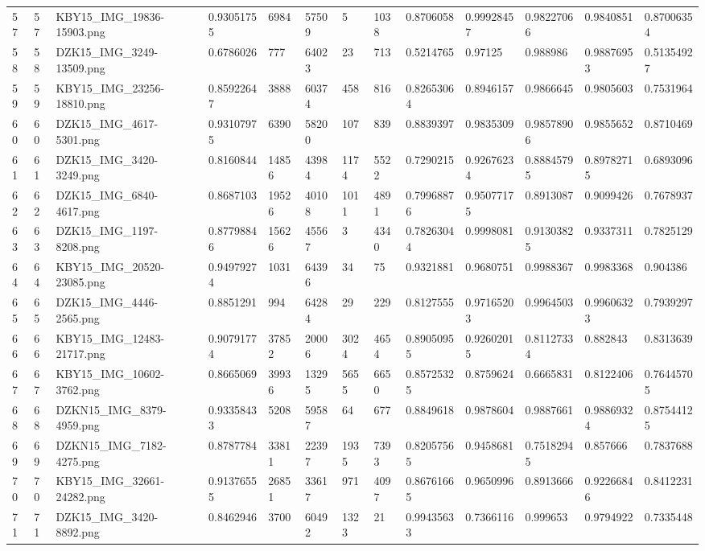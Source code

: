 \documentclass[11pt, a4paper, twoside]{report}
\begin{document}
\begin{longtable}[c]{@{}lllllllllllll@{}}
57 & 57 & KBY15\_IMG\_19836-15903.png & 0.93051755 & 6984 & 57509 & 5 & 1038 & 0.8706058 & 0.99928457 & 0.98227066 & 0.9840851 & 0.87006354 \\
58 & 58 & DZK15\_IMG\_3249-13509.png & 0.6786026 & 777 & 64023 & 23 & 713 & 0.5214765 & 0.97125 & 0.988986 & 0.98876953 & 0.51354927 \\
59 & 59 & KBY15\_IMG\_23256-18810.png & 0.85922647 & 3888 & 60374 & 458 & 816 & 0.82653064 & 0.8946157 & 0.9866645 & 0.9805603 & 0.7531964 \\
60 & 60 & DZK15\_IMG\_4617-5301.png & 0.93107975 & 6390 & 58200 & 107 & 839 & 0.8839397 & 0.9835309 & 0.98578906 & 0.9855652 & 0.8710469 \\
61 & 61 & DZK15\_IMG\_3420-3249.png & 0.8160844 & 14856 & 43984 & 1174 & 5522 & 0.7290215 & 0.92676234 & 0.88845795 & 0.89782715 & 0.6893096 \\
62 & 62 & DZK15\_IMG\_6840-4617.png & 0.8687103 & 19526 & 40108 & 1011 & 4891 & 0.79968876 & 0.95077175 & 0.8913087 & 0.9099426 & 0.7678937 \\
63 & 63 & DZK15\_IMG\_1197-8208.png & 0.87798846 & 15626 & 45567 & 3 & 4340 & 0.78263044 & 0.9998081 & 0.91303825 & 0.9337311 & 0.7825129 \\
64 & 64 & KBY15\_IMG\_20520-23085.png & 0.94979274 & 1031 & 64396 & 34 & 75 & 0.9321881 & 0.9680751 & 0.9988367 & 0.9983368 & 0.904386 \\
65 & 65 & DZK15\_IMG\_4446-2565.png & 0.8851291 & 994 & 64284 & 29 & 229 & 0.8127555 & 0.97165203 & 0.9964503 & 0.99606323 & 0.7939297 \\
66 & 66 & KBY15\_IMG\_12483-21717.png & 0.90791774 & 37852 & 20006 & 3024 & 4654 & 0.89050955 & 0.92602015 & 0.81127334 & 0.882843 & 0.8313639 \\
67 & 67 & KBY15\_IMG\_10602-3762.png & 0.8665069 & 39936 & 13295 & 5655 & 6650 & 0.85725325 & 0.8759624 & 0.6665831 & 0.8122406 & 0.76445705 \\
68 & 68 & DZKN15\_IMG\_8379-4959.png & 0.93358433 & 5208 & 59587 & 64 & 677 & 0.8849618 & 0.9878604 & 0.9887661 & 0.98869324 & 0.87544125 \\
69 & 69 & DZKN15\_IMG\_7182-4275.png & 0.8787784 & 33811 & 22397 & 1935 & 7393 & 0.82057565 & 0.9458681 & 0.75182945 & 0.857666 & 0.7837688 \\
70 & 70 & KBY15\_IMG\_32661-24282.png & 0.91376555 & 26851 & 33617 & 971 & 4097 & 0.86761665 & 0.9650996 & 0.8913666 & 0.92266846 & 0.8412231 \\
71 & 71 & DZK15\_IMG\_3420-8892.png & 0.8462946 & 3700 & 60492 & 1323 & 21 & 0.99435633 & 0.7366116 & 0.999653 & 0.9794922 & 0.7335448 \\

\end{longtable}
\end{document}
